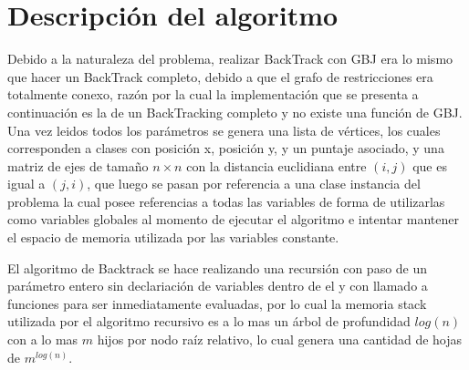 \section{Descripci\'on del algoritmo}\label{descript}
Debido a la naturaleza del problema, realizar BackTrack con GBJ era lo mismo que hacer un BackTrack completo, debido a que el grafo de restricciones era totalmente conexo, raz\'on por la cual la implementaci\'on que se presenta a continuaci\'on es la de un BackTracking completo y no existe una funci\'on de GBJ.\\

Una vez leidos todos los par\'ametros se genera una lista de v\'ertices, los cuales corresponden a clases con posici\'on x, posici\'on y, y un puntaje asociado, y una matriz de ejes de tama\~no $n \times n$ con la distancia euclidiana entre $(i,j)$ que es igual a $(j,i)$, que luego se pasan por referencia a una clase instancia del problema la cual posee referencias a todas las variables de forma de utilizarlas como variables globales al momento de ejecutar el algoritmo e intentar mantener el espacio de memoria utilizada por las variables constante.

El algoritmo de Backtrack se hace realizando una recursi\'on con paso de un par\'ametro entero sin declariaci\'on de variables dentro de el y con llamado a funciones para ser inmediatamente evaluadas, por lo cual la memoria stack utilizada por el algoritmo recursivo es a lo mas un \'arbol de profundidad $log(n)$ con a lo mas $m$ hijos por nodo ra\'iz relativo, lo cual genera una cantidad de hojas de $m^{log(n)}$.

